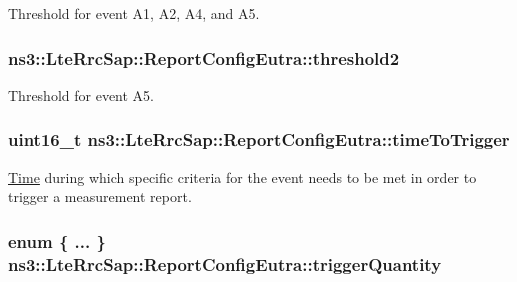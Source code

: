 Threshold for event A1, A2, A4, and A5. 

\subsubsection[{\texorpdfstring{threshold2}{threshold2}}]{ ns3\+::\+Lte\+Rrc\+Sap\+::\+Report\+Config\+Eutra\+::threshold2}\hypertarget{structns3_1_1LteRrcSap_1_1ReportConfigEutra_a4c76552279ea09626d15b48b341bfbd1}{}\label{structns3_1_1LteRrcSap_1_1ReportConfigEutra_a4c76552279ea09626d15b48b341bfbd1}


Threshold for event A5. 

\subsubsection[{\texorpdfstring{time\+To\+Trigger}{timeToTrigger}}]{\setlength{\rightskip}{0pt plus 5cm}uint16\+\_\+t ns3\+::\+Lte\+Rrc\+Sap\+::\+Report\+Config\+Eutra\+::time\+To\+Trigger}\hypertarget{structns3_1_1LteRrcSap_1_1ReportConfigEutra_aee64b76b166b1beda5bbe1760363ed24}{}\label{structns3_1_1LteRrcSap_1_1ReportConfigEutra_aee64b76b166b1beda5bbe1760363ed24}


\hyperlink{classns3_1_1Time}{Time} during which specific criteria for the event needs to be met in order to trigger a measurement report. 

\subsubsection[{\texorpdfstring{trigger\+Quantity}{triggerQuantity}}]{\setlength{\rightskip}{0pt plus 5cm}enum \{ ... \}   ns3\+::\+Lte\+Rrc\+Sap\+::\+Report\+Config\+Eutra\+::trigger\+Quantity}\hypertarget{structns3_1_1LteRrcSap_1_1ReportConfigEutra_a735700933e50f1b4680f856d37c777f9}{}\label{structns3_1_1LteRrcSap_1_1ReportConfigEutra_a735700933e50f1b4680f856d37c777f9}



